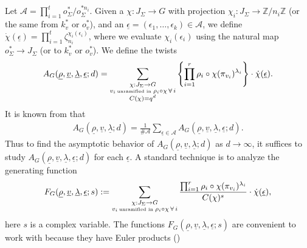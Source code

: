 \documentclass[12pt]{amsart}
\theoremstyle{plain}
\begin{document}
Let ${\mathcal{A}}=\prod_{i=1}^t o_{\Sigma}^*/o_{\Sigma}^{*n_i}$. Given a $\chi: J_{\Sigma} \to G$ with projection $\chi_i: J_{\Sigma} \to {{\mathbb Z}}/n_i{{\mathbb Z}}$ (or the same from $k_v^*$ or $o_v^*$), and an ${\underline{{\epsilon}}}=(\epsilon_1,\ldots,\epsilon_k) \in {\mathcal{A}}$, we define $\dot{\chi}({\underline{{\epsilon}}})=\prod_{i=1}^t
\zeta_{n_i}^{\chi_i(\epsilon_i)}$, where we evaluate $\chi_i(\epsilon_i)$ using the natural map $o_{\Sigma}^* \to J_{\Sigma}$ (or to $k_v^*$ or $o_{v}^*$). We define the twists
\begin{eqnarray} \label{3:twi} {A_{G}({\underline{{\rho}}},{\underline{{v}}},{\underline{{\lambda}}},{\underline{{\epsilon}}};d)}=
\sum_{\substack{\chi:J_{\Sigma} \to G \\
v_i \, \mbox{\tiny unramified in } \rho_i \circ \chi \, \forall \, i\\
C(\chi)=q^d}} \left\{\prod_{i=1}^r \rho_i \circ \chi (\pi_{v_i})^{\lambda_i}\right\} \cdot \dot{\chi}({\underline{{\epsilon}}}). \end{eqnarray}
It is known from \cite[Corollary 2.9]{woo} that
\begin{eqnarray} \label{3:epf} {A_{G}({\underline{{\rho}}},{\underline{{v}}},{\underline{{\lambda}}};d)}=\frac{1}{\#{\mathcal{A}}}
\sum_{{\underline{{\epsilon}}} \in {\mathcal{A}}}{A_{G}({\underline{{\rho}}},{\underline{{v}}},{\underline{{\lambda}}},{\underline{{\epsilon}}};d)}. \end{eqnarray}
Thus to find the asymptotic behavior of ${A_{G}({\underline{{\rho}}},{\underline{{v}}},{\underline{{\lambda}}};d)}$ as $d \to \infty$, it suffices to study ${A_{G}({\underline{{\rho}}},{\underline{{v}}},{\underline{{\lambda}}},{\underline{{\epsilon}}};d)}$ for each ${\underline{{\epsilon}}}$. A standard technique is to analyze the generating function
\begin{eqnarray*} \label{3:gb}
F_{G}({\underline{{\rho}}},{\underline{{v}}},{\underline{{\lambda}}},{\underline{{\epsilon}}};s):=\sum_{\substack{\chi:J_{\Sigma} \to G \\
v_i \, \mbox{\tiny unramified in } \rho_i \circ \chi \, \forall \, i}} \frac{\prod_{i=1}^r \rho_i \circ \chi (\pi_{v_i})^{\lambda_i}}{C(\chi)^s} \cdot \dot{\chi}({\underline{{\epsilon}}}),
\end{eqnarray*}
here $s$ is a complex variable. The functions $F_G({\underline{{\rho}}},{\underline{{v}}},{\underline{{\lambda}}},{\underline{{\epsilon}}};s)$ are convenient to work with because they have Euler products (\cite{woo,wri})
\end{document}
